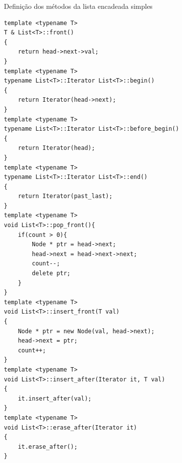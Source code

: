 \begin{listing}[!ht]
\caption{Definição dos métodos da lista encadeada simples}
\begin{verbatim}
template <typename T> 
T & List<T>::front()
{
    return head->next->val;
}
template <typename T> 
typename List<T>::Iterator List<T>::begin()
{
    return Iterator(head->next);
}
template <typename T> 
typename List<T>::Iterator List<T>::before_begin()
{
    return Iterator(head);
}
template <typename T> 
typename List<T>::Iterator List<T>::end()
{
    return Iterator(past_last);
}
template <typename T> 
void List<T>::pop_front(){
    if(count > 0){
        Node * ptr = head->next;
        head->next = head->next->next;
        count--;
        delete ptr;
    }
}
template <typename T> 
void List<T>::insert_front(T val)
{
    Node * ptr = new Node(val, head->next);
    head->next = ptr;
    count++;   
}
template <typename T> 
void List<T>::insert_after(Iterator it, T val)
{
    it.insert_after(val);
}
template <typename T> 
void List<T>::erase_after(Iterator it)
{
    it.erase_after();
}
\end{verbatim}
\end{listing}









